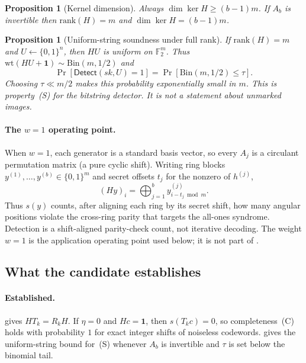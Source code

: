 \documentclass[11pt,a4paper]{article}
\newtheorem{proposition}[theorem]{Proposition}
\newcommand{\Det}{\mathsf{Detect}}
\newcommand{\wt}{\mathrm{wt}}
\newcommand{\sk}{\mathit{sk}}
\begin{document}
\begin{proposition}[Kernel dimension]
\label{prop:ker}
Always \(\dim\ker H\ge (b-1)m\).
If \(A_b\) is invertible then \(\mathrm{rank}(H)=m\) and \(\dim\ker H=(b-1)m\).
\end{proposition}

\begin{proposition}[Uniform-string soundness under full rank]
\label{prop:S}
If \(\mathrm{rank}(H)=m\) and \(U\leftarrow\{0,1\}^n\), then \(HU\) is uniform on
\(\mathbb{F}_2^m\).
Thus \(\wt(HU+\mathbf{1})\sim\mathrm{Bin}(m,1/2)\) and
\[
\Pr[\Det(\sk,U)=1]=\Pr[\mathrm{Bin}(m,1/2)\le\tau].
\]
Choosing \(\tau\ll m/2\) makes this probability exponentially small in \(m\).
This is property~(S) for the bitstring detector.
It is not a statement about unmarked images.
\end{proposition}

\paragraph{The \(w=1\) operating point.}
When \(w=1\), each generator is a standard basis vector, so every \(A_j\) is a
circulant permutation matrix (a pure cyclic shift).
Writing ring blocks \(y^{(1)},\ldots,y^{(b)}\in\{0,1\}^m\) and secret offsets
\(t_j\) for the nonzero of \(h^{(j)}\),
\[
(Hy)_i=\bigoplus_{j=1}^{b} y^{(j)}_{i-t_j\bmod m}.
\]
Thus \(s(y)\) counts, after aligning each ring by its secret shift, how many
angular positions violate the cross-ring parity that targets the all-ones syndrome.
Detection is a shift-aligned parity-check count, not iterative decoding.
The weight \(w=1\) is the application operating point used below; it is not part of
.

\subsection{What the candidate establishes}
\label{sec:status}

\paragraph{Established.}
 gives \(HT_k=R_kH\).
If \(\eta=0\) and \(Hc=\mathbf{1}\), then \(s(T_kc)=0\), so completeness~(C) holds
with probability \(1\) for exact integer shifts of noiseless codewords.
 gives the uniform-string bound for~(S) whenever \(A_b\) is invertible
and \(\tau\) is set below the binomial tail.
\end{document}
